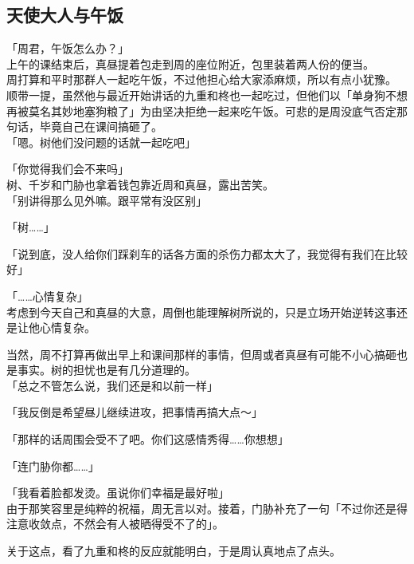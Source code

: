 \subsection{天使大人与午饭}

「周君，午饭怎么办？」\\

上午的课结束后，真昼提着包走到周的座位附近，包里装着两人份的便当。\\

周打算和平时那群人一起吃午饭，不过他担心给大家添麻烦，所以有点小犹豫。\\

顺带一提，虽然他与最近开始讲话的九重和柊也一起吃过，但他们以「单身狗不想再被莫名其妙地塞狗粮了」为由坚决拒绝一起来吃午饭。可悲的是周没底气否定那句话，毕竟自己在课间搞砸了。\\

「嗯。树他们没问题的话就一起吃吧」

「你觉得我们会不来吗」\\

树、千岁和门胁也拿着钱包靠近周和真昼，露出苦笑。\\

「别讲得那么见外嘛。跟平常有没区别」

「树……」

「说到底，没人给你们踩刹车的话各方面的杀伤力都太大了，我觉得有我们在比较好」

「……心情复杂」\\

考虑到今天自己和真昼的大意，周倒也能理解树所说的，只是立场开始逆转这事还是让他心情复杂。

当然，周不打算再做出早上和课间那样的事情，但周或者真昼有可能不小心搞砸也是事实。树的担忧也是有几分道理的。\\

「总之不管怎么说，我们还是和以前一样」

「我反倒是希望昼儿继续进攻，把事情再搞大点～」

「那样的话周围会受不了吧。你们这感情秀得……你想想」

「连门胁你都……」

「我看着脸都发烫。虽说你们幸福是最好啦」\\

由于那笑容里是纯粹的祝福，周无言以对。接着，门胁补充了一句「不过你还是得注意收敛点，不然会有人被晒得受不了的」。

关于这点，看了九重和柊的反应就能明白，于是周认真地点了点头。\\

